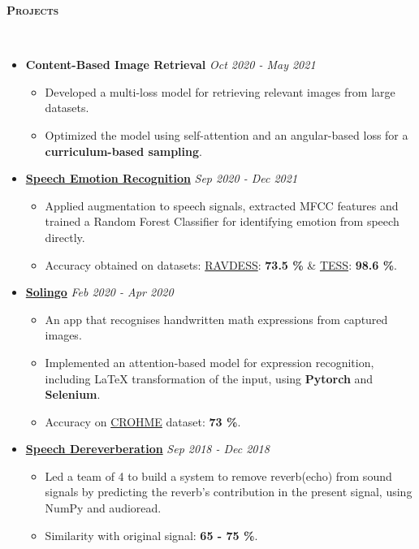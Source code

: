 \documentclass[10pt]{article}
\renewcommand{\section}[1]{
\bigskip
  \begin{Large}
  {\textsc{\textbf{#1}}}
  \end{Large}
  \hrulefill
  \medskip
  \\
}
\newenvironment{lonemidlist}[1][\enskip\textbullet]%
        {\begin{itemize}[#1,leftmargin=*,parsep=0pt,itemsep=4pt,topsep=0pt,partopsep=0pt]}
        {\end{itemize}}
\begin{document}
\section{Projects}
\vspace{-4mm}
\label{sec:proj}
\begin{lonemidlist}
\item\textbf{Content-Based Image Retrieval} \hfill {\textit{Oct 2020 - May 2021}}
\begin{itemize}
    \item Developed a multi-loss model for retrieving relevant images from large datasets.
    \item Optimized the model using self-attention and an angular-based loss for a \textbf{curriculum-based sampling}.
\end{itemize}
\item\href{https://github.com/Debapriya-Tula/NLP-Project}{\textbf{Speech Emotion Recognition}} \hfill {\textit{Sep 2020 - Dec 2021}}
\begin{itemize}
     \item Applied augmentation to speech signals, extracted MFCC features and trained a Random Forest Classifier for identifying emotion from speech directly.
     \item Accuracy obtained on datasets: \href{https://journals.plos.org/plosone/article?id=10.1371/journal.pone.0196391} {RAVDESS}: \textbf{73.5 \%} \& \href{https://tspace.library.utoronto.ca/handle/1807/24487} {TESS}: \textbf{98.6 \%}.
\end{itemize}
\item\href{https://github.com/Debapriya-Tula/Solve-it-in-a-go}{\textbf{Solingo}} \hfill {\textit{Feb 2020 - Apr 2020}}
\begin{itemize}
     \item An app that recognises handwritten math expressions from captured images.
     \item Implemented an attention-based model for expression recognition, including LaTeX transformation of the input, using \textbf{Pytorch} and \textbf{Selenium}.
     \item Accuracy on \href{https://researchdata.edu.au/crohme-competition-recognition-expressions-png/639782}{CROHME} dataset: \textbf{73 \%}.
\end{itemize}
\item\href{https://github.com/Debapriya-Tula/Speech_Dereverberation}{\textbf{Speech Dereverberation}} \hfill {\textit{Sep 2018 - Dec 2018}}
\begin{itemize}
     \item Led a team of 4 to build a system to remove reverb(echo) from sound signals by predicting the reverb’s contribution in the present signal, using NumPy and audioread.
     \item Similarity with original signal: \textbf{65 - 75 \%}.
\end{itemize}
\end{lonemidlist}
\end{document}
